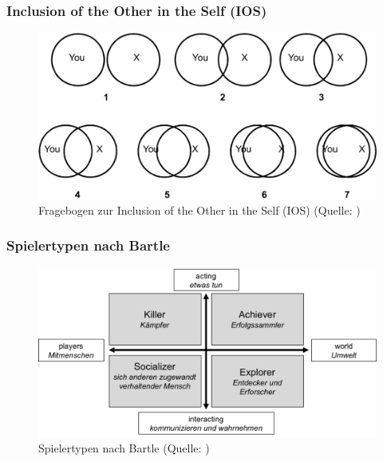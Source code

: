 \documentclass[
	12pt,
	a4paper,
	bibtotoc,
	cleardoubleempty, 
	idxtotoc,
	ngerman,
	openright
	final,
	listof=nochaptergap,
	]{scrbook}
\begin{document}
\begin{appendices}
\clearpage

\subsubsection{Inclusion of the Other in the Self (IOS)}\label{sec:append_study_ios}


\begin{figure}[ht]
\centering
\includegraphics[width=1\linewidth]{content/attachments/questtionaires/IOS.png}
\caption{Fragebogen zur Inclusion of the Other in the Self (IOS) (Quelle: \citealp{gachter_measuring_2015})}
\label{fig:append_ios}
\end{figure}



\subsubsection{Spielertypen nach Bartle}\label{sec:append_study_bartle}


\begin{figure}[ht]
\centering
\includegraphics[width=1\linewidth]{content/attachments/questtionaires/bartle-spielertypenbrell-1024x512.png}
\caption{Spielertypen nach Bartle (Quelle: \citealp{bartle_hearts_1996})}
\label{fig:append_bartle}
\end{figure}


\end{appendices}
\end{document}
